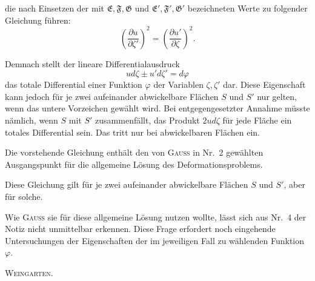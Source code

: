 %
\noindent die nach Einsetzen der mit $\mathfrak{E},\mathfrak{F},\mathfrak{G}$ und $\mathfrak{E}',\mathfrak{F}',\mathfrak{G}'$ bezeichneten Werte zu folgender Gleichung führen:
\[
\left(\frac{\partial u}{\partial\zeta'}\right)^2=\left(\frac{\partial u'}{\partial\zeta}\right)^2.
\]

\noindent Demnach stellt der lineare Differentialausdruck
\[
ud\zeta\pm u'd\zeta'=d\varphi
\]
\noindent das totale Differential einer Funktion $\varphi$ der Variablen $\zeta,\zeta'$ dar. Diese Eigenschaft kann jedoch für je zwei aufeinander abwickelbare Flächen $S$ und $S'$ nur gelten, wenn das untere Vorzeichen gewählt wird. Bei entgegengesetzter Annahme müsste nämlich, wenn $S$ mit $S'$ zusammenfällt, das Produkt $2ud\zeta$ für jede Fläche ein totales Differential sein. Das tritt nur bei abwickelbaren Flächen ein.

Die vorstehende Gleichung enthält den von \textsc{Gauss} in Nr.\ 2 gewählten Ausgangspunkt für die allgemeine Lösung des Deformationsproblems.

Diese Gleichung gilt für je zwei aufeinander abwickelbare Flächen $S$ und $S'$, aber  für solche.

Wie \textsc{Gauss} sie für diese allgemeine Lösung nutzen wollte, lässt sich aus Nr.\ 4 der Notiz nicht unmittelbar erkennen. Diese Frage erfordert noch eingehende Untersuchungen der Eigenschaften der im jeweiligen Fall zu wählenden Funktion $\varphi$.
\begin{flushright}\textsc{Weingarten}.\end{flushright}

